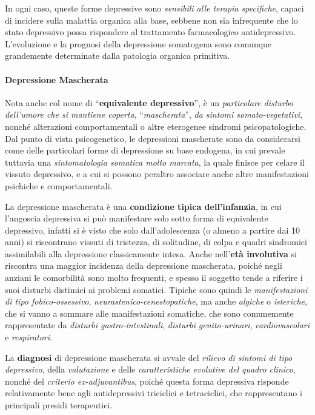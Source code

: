 In ogni caso, queste forme depressive sono \emph{sensibili alle terapia
specifiche}, capaci di incidere sulla malattia organica alla base,
sebbene non sia infrequente che lo stato depressivo possa rispondere al
trattamento farmacologico antidepressivo. L'evoluzione e la prognosi
della depressione somatogena sono comunque grandemente determinate dalla
patologia organica primitiva.

\paragraph{Depressione Mascherata}

Nota anche col nome di ``\textbf{equivalente depressivo}'', è un
\emph{particolare disturbo dell'umore che si mantiene coperta},
``\emph{mascherata}'', \emph{da sintomi somato-vegetativi}, nonché
alterazioni comportamentali o altre eterogenee sindromi
psicopatologiche. Dal punto di vista psicogenetico, le depressioni
mascherate sono da considerarsi come delle particolari forme di
depressione su base endogena, in cui prevale tuttavia una
\emph{sintomatologia somatica molto marcata}, la quale finisce per
celare il vissuto depressivo, e a cui si possono peraltro associare
anche altre manifestazioni psichiche e comportamentali.

La depressione mascherata è una \textbf{condizione tipica
dell'infanzia}, in cui l'angoscia depressiva si può manifestare solo
sotto forma di equivalente depressivo, infatti si è visto che solo
dall'adolescenza (o almeno a partire dai 10 anni) si riscontrano vissuti
di tristezza, di solitudine, di colpa e quadri sindromici assimilabili
alla depressione classicamente intesa. Anche nell'\textbf{età
involutiva} si riscontra una maggior incidenza della depressione
mascherata, poiché negli anziani le comorbilità sono molto frequenti, e
spesso il soggetto tende a riferire i suoi disturbi distimici ai
problemi somatici. Tipiche sono quindi le \emph{manifestazioni di tipo
fobico-ossessivo}, \emph{neurastenico-cenestopatiche}, ma anche
\emph{algiche} o \emph{isteriche}, che si vanno a sommare alle
manifestazioni somatiche, che sono comunemente rappresentate da
\emph{disturbi gastro-intestinali}, \emph{disturbi genito-urinari},
\emph{cardiovascolari} e \emph{respiratori}.

La \textbf{diagnosi} di depressione mascherata si avvale del
\emph{rilievo di sintomi di tipo depressivo}, della \emph{valutazione} e
delle \emph{caratteristiche evolutive del quadro clinico}, nonché del
\emph{criterio ex-adjuvantibus}, poiché questa forma depressiva risponde
relativamente bene agli antidepressivi triciclici e tetraciclici, che
rappresentano i principali presidi terapeutici.

